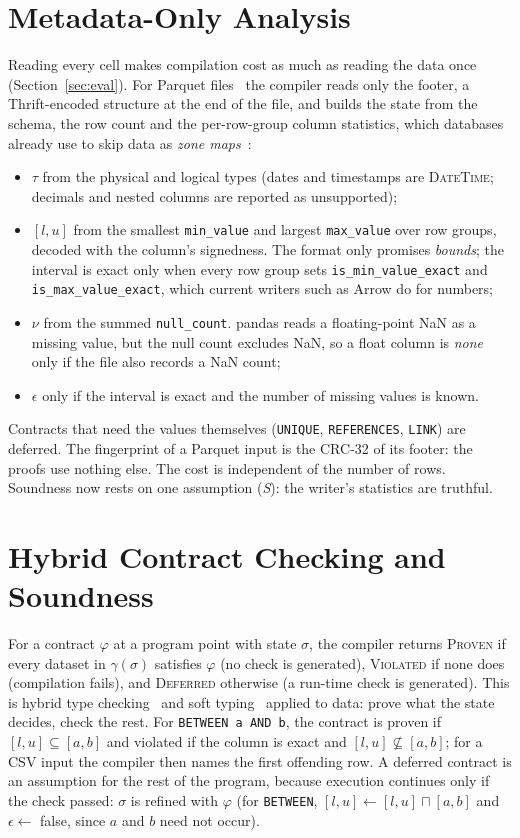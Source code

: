 \documentclass[conference]{IEEEtran}
\begin{document}
\section{Metadata-Only Analysis}\label{sec:metadata}

Reading every cell makes compilation cost as much as reading the data once
(Section~\ref{sec:eval}). For Parquet files~\cite{parquet,melnik2010} the compiler reads only the
footer, a Thrift-encoded structure at the end of the file, and builds the state from the schema,
the row count and the per-row-group column statistics, which databases already use to skip data
as \emph{zone maps}~\cite{moerkotte1998}:
\begin{itemize}
\item $\tau$ from the physical and logical types (dates and timestamps are \textsc{DateTime};
decimals and nested columns are reported as unsupported);
\item $[l,u]$ from the smallest \texttt{min\_value} and largest \texttt{max\_value} over row groups,
decoded with the column's signedness. The format only promises \emph{bounds}; the interval is exact
only when every row group sets \texttt{is\_min\_value\_exact} and \texttt{is\_max\_value\_exact},
which current writers such as Arrow do for numbers;
\item $\nu$ from the summed \texttt{null\_count}. pandas reads a floating-point NaN as a missing
value, but the null count excludes NaN, so a float column is \textit{none} only if the file also
records a NaN count;
\item $\epsilon$ only if the interval is exact and the number of missing values is known.
\end{itemize}
Contracts that need the values themselves (\texttt{UNIQUE}, \texttt{REFERENCES}, \texttt{LINK}) are
deferred. The fingerprint of a Parquet input is the CRC-32 of its footer: the proofs use nothing
else. The cost is independent of the number of rows. Soundness now rests on one assumption
(\emph{S}): the writer's statistics are truthful.

\section{Hybrid Contract Checking and Soundness}\label{sec:contracts}

For a contract $\varphi$ at a program point with state $\sigma$, the compiler returns
\textsc{Proven} if every dataset in $\gamma(\sigma)$ satisfies $\varphi$ (no check is generated),
\textsc{Violated} if none does (compilation fails), and \textsc{Deferred} otherwise (a run-time
check is generated). This is hybrid type checking~\cite{flanagan2006} and soft
typing~\cite{cartwright1991} applied to data: prove what the state decides, check the rest. For
\texttt{BETWEEN a AND b}, the contract is proven if $[l,u] \subseteq [a,b]$ and violated if the
column is exact and $[l,u] \not\subseteq [a,b]$; for a CSV input the compiler then names the first
offending row. A deferred contract is an assumption for the rest of the program, because execution
continues only if the check passed: $\sigma$ is refined with $\varphi$ (for \texttt{BETWEEN},
$[l,u] \gets [l,u] \sqcap [a,b]$ and $\epsilon \gets$ false, since $a$ and $b$ need not occur).
\end{document}
